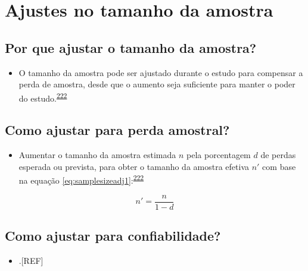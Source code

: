 \documentclass[
  a4paper,
]{book}
\providecommand{\tightlist}{%
  \setlength{\itemsep}{0pt}\setlength{\parskip}{0pt}}
\begin{document}
\hypertarget{ajustes-no-tamanho-da-amostra}{%
\section{Ajustes no tamanho da amostra}\label{ajustes-no-tamanho-da-amostra}}

\hypertarget{por-que-ajustar-o-tamanho-da-amostra}{%
\subsection{Por que ajustar o tamanho da amostra?}\label{por-que-ajustar-o-tamanho-da-amostra}}

\begin{itemize}
\tightlist
\item
  O tamanho da amostra pode ser ajustado durante o estudo para compensar a perda de amostra, desde que o aumento seja suficiente para manter o poder do estudo.\textsuperscript{\protect\hyperlink{ref-rodruxedguezdeluxe1guila2014}{222}}
\end{itemize}

\hypertarget{como-ajustar-para-perda-amostral}{%
\subsection{Como ajustar para perda amostral?}\label{como-ajustar-para-perda-amostral}}

\begin{itemize}
\tightlist
\item
  Aumentar o tamanho da amostra estimada \(n\) pela porcentagem \(d\) de perdas esperada ou prevista, para obter o tamanho da amostra efetiva \(n'\) com base na equação \eqref{eq:samplesizeadj1}:\textsuperscript{\protect\hyperlink{ref-rodruxedguezdeluxe1guila2014}{222}}
\end{itemize}

\begin{equation}
\label{eq:samplesizeadj1}
n' = \dfrac{n}{1-d}
\end{equation}

\hypertarget{como-ajustar-para-confiabilidade}{%
\subsection{Como ajustar para confiabilidade?}\label{como-ajustar-para-confiabilidade}}

\begin{itemize}
\tightlist
\item
  .{[}REF{]}
\end{itemize}
\end{document}
